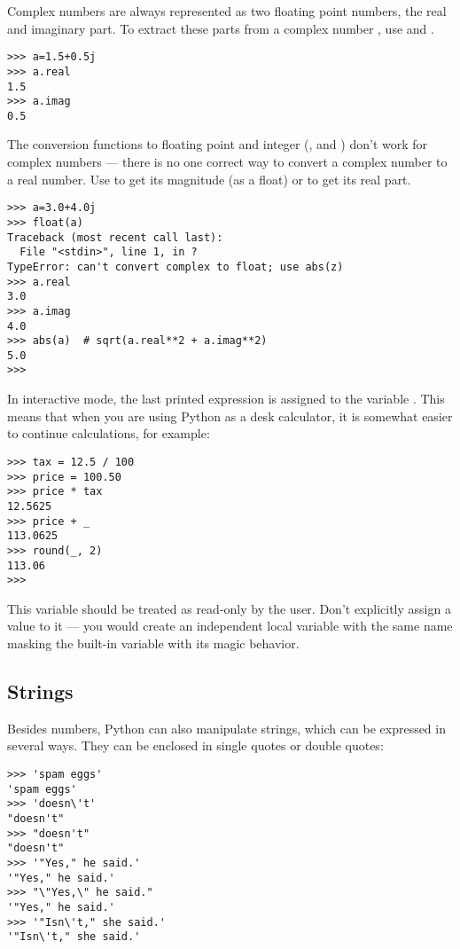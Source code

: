 \documentclass{manual}
\begin{document}
Complex numbers are always represented as two floating point numbers,
the real and imaginary part.  To extract these parts from a complex
number , use  and .  

\begin{verbatim}
>>> a=1.5+0.5j
>>> a.real
1.5
>>> a.imag
0.5
\end{verbatim}

The conversion functions to floating point and integer
(,  and ) don't
work for complex numbers --- there is no one correct way to convert a
complex number to a real number.  Use  to get its
magnitude (as a float) or  to get its real part.

\begin{verbatim}
>>> a=3.0+4.0j
>>> float(a)
Traceback (most recent call last):
  File "<stdin>", line 1, in ?
TypeError: can't convert complex to float; use abs(z)
>>> a.real
3.0
>>> a.imag
4.0
>>> abs(a)  # sqrt(a.real**2 + a.imag**2)
5.0
>>>
\end{verbatim}

In interactive mode, the last printed expression is assigned to the
variable \code{_}.  This means that when you are using Python as a
desk calculator, it is somewhat easier to continue calculations, for
example:

\begin{verbatim}
>>> tax = 12.5 / 100
>>> price = 100.50
>>> price * tax
12.5625
>>> price + _
113.0625
>>> round(_, 2)
113.06
>>>
\end{verbatim}

This variable should be treated as read-only by the user.  Don't
explicitly assign a value to it --- you would create an independent
local variable with the same name masking the built-in variable with
its magic behavior.

\subsection{Strings \label{strings}}

Besides numbers, Python can also manipulate strings, which can be
expressed in several ways.  They can be enclosed in single quotes or
double quotes:

\begin{verbatim}
>>> 'spam eggs'
'spam eggs'
>>> 'doesn\'t'
"doesn't"
>>> "doesn't"
"doesn't"
>>> '"Yes," he said.'
'"Yes," he said.'
>>> "\"Yes,\" he said."
'"Yes," he said.'
>>> '"Isn\'t," she said.'
'"Isn\'t," she said.'
\end{verbatim}
\end{document}
